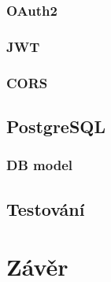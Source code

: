\documentclass[a4paper,11pt,titlepage,fleqn]{article}
\begin{document}
        \subsubsection{OAuth2}

        \subsubsection{JWT}

        \subsubsection{CORS}

    \subsection{PostgreSQL}

        \subsubsection{DB model}

    \subsection{Testování}


\newpage
\section{Závěr}

\newpage
\begin{thebibliography}{99}
\end{thebibliography}
\end{document}
